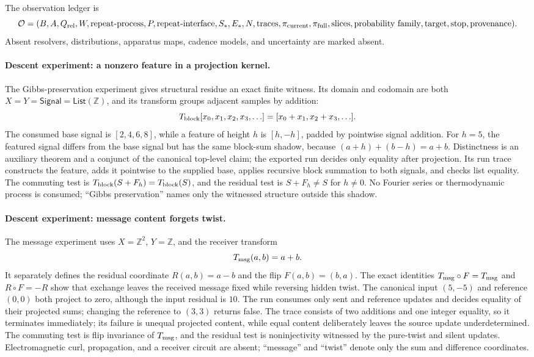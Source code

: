 The observation ledger is
\[
 \mathcal O=(B,A,Q_{\rm rel},W,\text{repeat-process},P,\text{repeat-interface},
             S_*,E_*,N,\text{traces},
             \pi_{\rm current},\pi_{\rm full},\text{slices},
             \text{probability family},\text{target},\text{stop},\text{provenance}).
\]
Absent resolvers, distributions, apparatus maps, cadence models, and uncertainty are marked absent.

\paragraph{Descent experiment: a nonzero feature in a projection kernel.}
The Gibbs-preservation experiment gives structural residue an exact finite witness.
Its domain and codomain are both \(X=Y=\mathsf{Signal}=\mathsf{List}(\mathbb Z)\), and its transform groups adjacent samples by addition:
\[
 T_{\rm block}[x_0,x_1,x_2,x_3,\ldots]
   =[x_0+x_1,x_2+x_3,\ldots].
\]
The consumed base signal is \([2,4,6,8]\), while a feature of height \(h\) is \([h,-h]\), padded by pointwise signal addition.
For \(h=5\), the featured signal differs from the base signal but has the same block-sum shadow, because \((a+h)+(b-h)=a+b\).
Distinctness is an auxiliary theorem and a conjunct of the canonical top-level claim; the exported run decides only equality after projection.
Its run trace constructs the feature, adds it pointwise to the supplied base, applies recursive block summation to both signals, and checks list equality.
The commuting test is \(T_{\rm block}(S+F_h)=T_{\rm block}(S)\), and the residual test is \(S+F_h\ne S\) for \(h\ne0\).
No Fourier series or thermodynamic process is consumed; ``Gibbs preservation'' names only the witnessed structure
outside this shadow.

\paragraph{Descent experiment: message content forgets twist.}
The message experiment uses \(X=\mathbb Z^2\), \(Y=\mathbb Z\), and the receiver transform
\[
 T_{\rm msg}(a,b)=a+b.
\]
It separately defines the residual coordinate \(R(a,b)=a-b\) and the flip \(F(a,b)=(b,a)\).
The exact identities \(T_{\rm msg}\circ F=T_{\rm msg}\) and \(R\circ F=-R\) show that exchange leaves the received message fixed while reversing hidden twist.
The canonical input \((5,-5)\) and reference \((0,0)\) both project to zero, although the input residual is \(10\).
The run consumes only sent and reference updates and decides equality of their projected sums; changing the reference to \((3,3)\) returns false.
The trace consists of two additions and one integer equality, so it terminates immediately; its failure is unequal projected content, while equal content deliberately leaves the source update underdetermined.
The commuting test is flip invariance of \(T_{\rm msg}\), and the residual test is noninjectivity witnessed by the pure-twist and silent updates.
Electromagnetic curl, propagation, and a receiver circuit are absent; ``message'' and ``twist'' denote only the sum
and difference coordinates.

